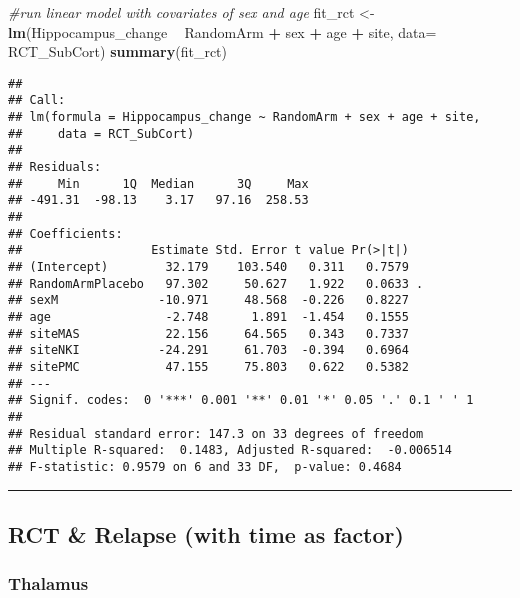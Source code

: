\documentclass[]{article}
\newenvironment{Shaded}{\begin{snugshade}}{\end{snugshade}}
\newcommand{\KeywordTok}[1]{\textcolor[rgb]{0.13,0.29,0.53}{\textbf{#1}}}
\newcommand{\DataTypeTok}[1]{\textcolor[rgb]{0.13,0.29,0.53}{#1}}
\newcommand{\StringTok}[1]{\textcolor[rgb]{0.31,0.60,0.02}{#1}}
\newcommand{\CommentTok}[1]{\textcolor[rgb]{0.56,0.35,0.01}{\textit{#1}}}
\newcommand{\OperatorTok}[1]{\textcolor[rgb]{0.81,0.36,0.00}{\textbf{#1}}}
\newcommand{\NormalTok}[1]{#1}
\theoremstyle{definition}
\theoremstyle{definition}
\theoremstyle{definition}
\theoremstyle{remark}
\begin{document}
\begin{Shaded}
\begin{Highlighting}[]
\CommentTok{#run linear model with covariates of sex and age}
\NormalTok{  fit_rct <-}\StringTok{ }\KeywordTok{lm}\NormalTok{(Hippocampus_change }\OperatorTok{~}\StringTok{ }\NormalTok{RandomArm }\OperatorTok{+}\StringTok{ }\NormalTok{sex }\OperatorTok{+}\StringTok{ }\NormalTok{age }\OperatorTok{+}\StringTok{ }\NormalTok{site, }\DataTypeTok{data=}\NormalTok{ RCT_SubCort)}
  \KeywordTok{summary}\NormalTok{(fit_rct)}
\end{Highlighting}
\end{Shaded}

\begin{verbatim}
## 
## Call:
## lm(formula = Hippocampus_change ~ RandomArm + sex + age + site, 
##     data = RCT_SubCort)
## 
## Residuals:
##     Min      1Q  Median      3Q     Max 
## -491.31  -98.13    3.17   97.16  258.53 
## 
## Coefficients:
##                  Estimate Std. Error t value Pr(>|t|)  
## (Intercept)        32.179    103.540   0.311   0.7579  
## RandomArmPlacebo   97.302     50.627   1.922   0.0633 .
## sexM              -10.971     48.568  -0.226   0.8227  
## age                -2.748      1.891  -1.454   0.1555  
## siteMAS            22.156     64.565   0.343   0.7337  
## siteNKI           -24.291     61.703  -0.394   0.6964  
## sitePMC            47.155     75.803   0.622   0.5382  
## ---
## Signif. codes:  0 '***' 0.001 '**' 0.01 '*' 0.05 '.' 0.1 ' ' 1
## 
## Residual standard error: 147.3 on 33 degrees of freedom
## Multiple R-squared:  0.1483, Adjusted R-squared:  -0.006514 
## F-statistic: 0.9579 on 6 and 33 DF,  p-value: 0.4684
\end{verbatim}

\begin{center}\rule{0.5\linewidth}{\linethickness}\end{center}

\subsection{RCT \& Relapse (with time as
factor)}\label{rct-relapse-with-time-as-factor-4}

\subsubsection{Thalamus}\label{thalamus-1}
\end{document}
